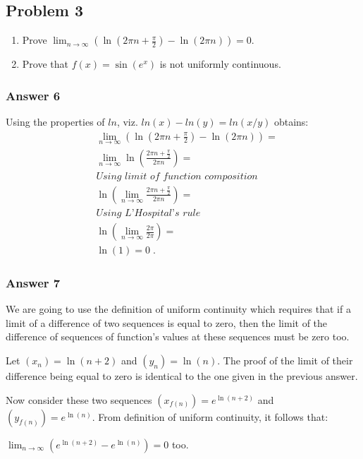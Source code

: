 \documentclass[a4paper]{article}
\begin{document}
\subsection{Problem 3}
\label{sec:orgheadline10}
\begin{enumerate}
\item Prove \(\lim_{n \to \infty}(\ln(2\pi n + \frac{\pi}{2}) - \ln(2\pi n)) = 0\).
\item Prove that \(f(x) = \sin(e^x)\) is not uniformly continuous.
\end{enumerate}

\subsubsection{Answer 6}
\label{sec:orgheadline8}
Using the properties of \(ln\), viz. \(ln(x) - ln(y) = ln(x / y)\) obtains:
\begin{align*}
  &\lim_{n \to \infty} \left(\ln(2\pi n + \frac{\pi}{2}) - \ln(2\pi n)\right) = \\
  &\lim_{n \to \infty} \ln\left(\frac{2\pi n + \frac{\pi}{2}}{2\pi n}\right) = \\
  &\textit{Using limit of function composition} \\
  &\ln\left(\lim_{n \to \infty} \frac{2\pi n + \frac{\pi}{2}}{2\pi n}\right) = \\
  &\textit{Using L'Hospital's rule} \\
  &\ln\left(\lim_{n \to \infty} \frac{2\pi}{2\pi}\right) = \\
  &\ln(1) = 0\;.
\end{align*}

\subsubsection{Answer 7}
\label{sec:orgheadline9}
We are going to use the definition of uniform continuity which requires that
if a limit of a difference of two sequences is equal to zero, then the limit
of the difference of sequences of function's values at these sequences must
be zero too.

Let \((x_n) = \ln(n + 2)\) and \((y_n) = \ln(n)\).  The proof of the limit of
their difference being equal to zero is identical to the one given in the
previous answer.

Now consider these two sequences \((x_{f(n)}) = e^{\ln(n + 2)}\) and
\((y_{f(n)}) = e^{\ln(n)}\).  From definition of uniform continuity, it
follows that:

\(\lim_{n \to \infty}\left(e^{\ln(n + 2)} - e^{\ln(n)}\right) = 0\) too.
\end{document}
